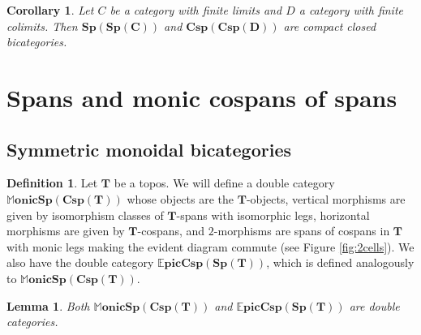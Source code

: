\documentclass[11pt]{amsart}
\newcommand{\cat}[1]{\mathbf{#1}}
\newcommand{\bispsp}[1]{\mathbf{Sp(Sp(#1))}}
\newcommand{\bicspcsp}[1]{\mathbf{Csp(Csp(#1))}}
\newcommand{\dblmonspcsp}[1]{\mathbb{M}\mathbf{onicSp(Csp(#1))}}
\newcommand{\dblepiccspsp}[1]{\mathbb{E}\mathbf{picCsp(Sp(#1))}}
\newtheorem{lem}[thm]{Lemma}
\newtheorem{cor}[thm]{Corollary}
\theoremstyle{remark}
\theoremstyle{definition}
\newtheorem{defn}[thm]{Definition}
\begin{document}
\begin{cor}
	\label{cor:SpansSpansAreCCBicat}
	Let $C$ be a category with finite limits and $D$ a category with finite colimits. Then $\bispsp{C}$ and $\bicspcsp{D}$ are compact closed bicategories.
\end{cor}

\section{Spans and monic cospans of spans} %
\label{sec:SpansCospans}

\subsection{Symmetric monoidal bicategories} %
\label{subsec.SpansCospansAreSMBicat}

\begin{defn}
\label{def:DblCatMonSpanCsp}
	Let $\cat{T}$ be a topos. We will define a double category $\dblmonspcsp{T}$ whose objects are the $\cat{T}$-objects, vertical morphisms are given by isomorphism classes of $\cat{T}$-spans with isomorphic legs, horizontal morphisms are given by $\cat{T}$-cospans, and $2$-morphisms are spans of cospans in $\cat{T}$ with monic legs making the evident diagram commute (see Figure \ref{fig:2cells}). We also have the double category $\dblepiccspsp{T}$, which is defined analogously to $\dblmonspcsp{T}$. 
\end{defn}

\begin{lem}
\label{lem:SpanCospanDoubleCat}
	Both $\dblmonspcsp{T}$ and $\dblepiccspsp{T}$ are double categories.  
\end{lem}
\end{document}
